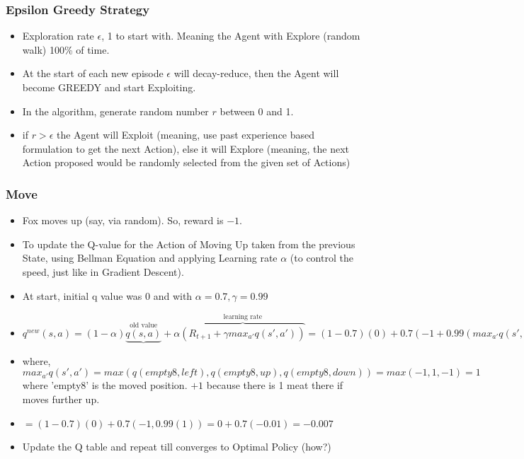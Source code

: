 \begin{frame}[fragile]\frametitle{Epsilon Greedy Strategy}


\begin{itemize}
\item Exploration rate $\epsilon$, 1 to start with. Meaning the Agent with Explore (random walk) 100\% of time.
\item At the start of each new episode $\epsilon$ will decay-reduce, then the Agent will become GREEDY and start Exploiting.
\item In the algorithm, generate random number $r$ between 0 and 1.
\item if $r > \epsilon$ the Agent will Exploit (meaning, use past experience based formulation to get the next Action), else it will Explore (meaning, the next Action proposed would be randomly selected from the given set of Actions)
\end{itemize}

\end{frame}


\begin{frame}[fragile]\frametitle{Move}

\begin{itemize}
\item Fox moves up (say, via random). So, reward is $-1$. 
\item To update the Q-value for the Action of Moving Up taken from the previous State, using Bellman Equation and applying Learning rate $\alpha$ (to control the speed, just like in Gradient Descent).
\item At start, initial q value was 0 and with $\alpha = 0.7, \gamma = 0.99$

\item 

$q^{new}(s,a) = (1 - \alpha)\underbrace{q(s,a)}^\text{old value} + \alpha \overbrace{(R_{t+1} + \gamma max_{a'} q(s',a'))}^\text{learning rate} = (1-0.7)(0) + 0.7(-1 + 0.99(max_{a'} q(s',a')))$ 
\item where, $max_{a'} q(s',a') = max(q(empty8,left), q(empty8, up), q(empty8,down)) = max(-1,1,-1) = 1$ where 'empty8' is the moved position. $+1$ because there is 1 meat there if moves further up.
\item $= (1-0.7)(0) + 0.7(-1, 0.99(1)) = 0 + 0.7(-0.01) = -0.007$
\item Update the Q table and repeat till converges to Optimal Policy (how?)
\end{itemize}

\end{frame}

